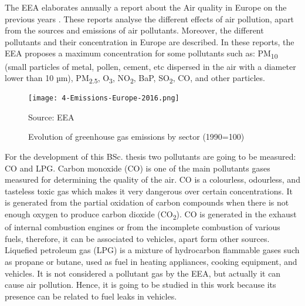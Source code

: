 The \acf{EEA} elaborates annually a report about the Air quality in Europe on the previous years \cite{AirQualityEEA17}. These reports analyse the different effects of air pollution, apart from the sources and emissions of air pollutants. Moreover, the different pollutants and their concentration in Europe are described. In these reports, the \ac{EEA} proposes a maximum concentration for some pollutants such as: PM\textsubscript{10} (small particles of metal, pollen, cement, etc dispersed in the air with a diameter lower than 10 µm), PM\textsubscript{2.5}, O\textsubscript{3}, NO\textsubscript{2}, BaP, SO\textsubscript{2}, CO, and other particles.

\begin{figure}[!h]
	\begin{center}
		\texttt{[image: 4-Emissions-Europe-2016.png]}	
		\caption{Evolution of greenhouse gas emissions by sector (1990=100)}{Source: \acf{EEA}}
		\label{fig:4-Emissions-Europe-2016}
	\end{center}
\end{figure}

For the development of this \ac{BSc.} thesis two pollutants are going to be measured: CO and LPG. Carbon monoxide (CO) is one of the main pollutants gases measured for determining the quality of the air. CO is a colourless, odourless, and tasteless toxic gas which makes it very dangerous over certain concentrations. It is generated from the partial oxidation of carbon compounds when there is not enough oxygen to produce carbon dioxide (CO\textsubscript{2}). CO is generated in the exhaust of internal combustion engines or from the incomplete combustion of various fuels, therefore, it can be associated to vehicles, apart form other sources. Liquefied petroleum gas (LPG) is a mixture of hydrocarbon flammable gases such as propane or butane, used as fuel in heating appliances, cooking equipment, and vehicles. It is not considered a pollutant gas by the \ac{EEA}, but actually it can cause air pollution. Hence, it is going to be studied in this work because its presence can be related to fuel leaks in vehicles.

